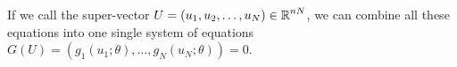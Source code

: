 If we call the super-vector $U = (u_1, u_2, \ldots, u_N) \in \operatorname{\mathbb{R}}^{nN}$, we can combine all these equations into one single system of equations $G(U) = (g_1(u_1; \theta), \ldots, g_N(u_N; \theta)) = 0$.


